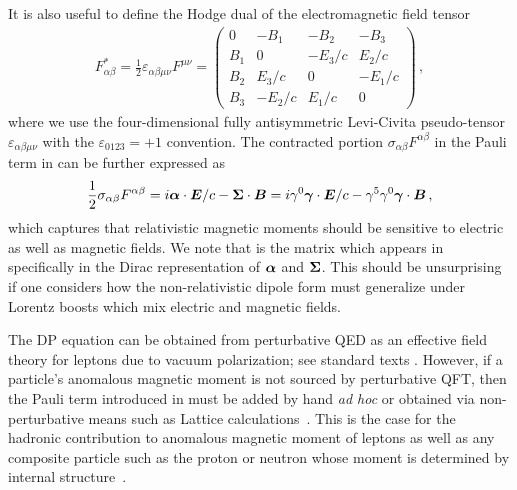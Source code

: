 It is also useful to define the Hodge dual of the electromagnetic field tensor
\begin{gather}
    \label{em:2}
    F_{\alpha\beta}^{*} = \frac{1}{2}\varepsilon_{\alpha\beta\mu\nu}F^{\mu\nu} = 
    \begin{pmatrix}
        0        & -B_{1}  & -B_{2}  & -B_{3}\\
        B_{1}  & 0         & -E_{3}/c    & E_{2}/c\\
        B_{2}  & E_{3}/c     & 0         & -E_{1}/c\\
        B_{3}  & -E_{2}/c    & E_{1}/c     & 0
    \end{pmatrix}\,,
\end{gather}
where we use the four-dimensional fully antisymmetric Levi-Civita pseudo-tensor $\varepsilon_{\alpha\beta\mu\nu}$ with the $\varepsilon_{0123}=+1$ convention. The contracted portion $\sigma_{\alpha\beta}F^{\alpha\beta}$ in the Pauli term in  can be further expressed as
\begin{alignat}{1}
	\label{dp:2} \frac{1}{2}\sigma_{\alpha\beta}F^{\alpha\beta} = i\boldsymbol{\alpha}\cdot\boldsymbol{E}/c-\boldsymbol{\Sigma}\cdot\boldsymbol{B} = i\gamma^{0}\boldsymbol{\gamma}\cdot\boldsymbol{E}/c-\gamma^{5}\gamma^{0}\boldsymbol{\gamma}\cdot\boldsymbol{B}\,,
\end{alignat}
which captures that relativistic magnetic moments should be sensitive to electric as well as magnetic fields. We note that  is the matrix which appears in  specifically in the Dirac representation of $\boldsymbol{\alpha}$ and $\boldsymbol{\Sigma}$. This should be unsurprising if one considers how the non-relativistic dipole form must generalize under Lorentz boosts which mix electric and magnetic fields.

The DP equation can be obtained from perturbative QED as an effective field theory for leptons due to vacuum polarization; see standard texts \cite{Itzykson:1980rh,Schwartz:2014sze}. However, if a particle's anomalous magnetic moment is not sourced by perturbative QFT, then the Pauli term introduced in  must be added by hand \emph{ad hoc} or obtained via non-perturbative means such as Lattice calculations~\citep{Aoyama:2020ynm}. This is the case for the hadronic contribution to anomalous magnetic moment of leptons as well as any composite particle such as the proton or neutron whose moment is determined by internal structure~\citep{Proceedings:2012ulb}.

